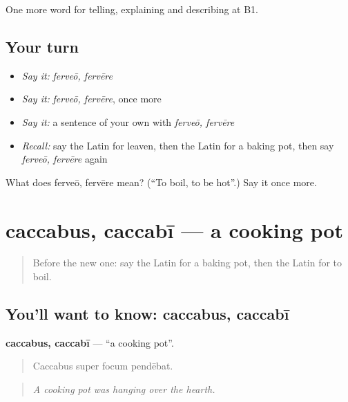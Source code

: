 \begin{grammarlens}[title={What you've built}]
One more word for telling, explaining and describing at B1.
\end{grammarlens}

\subsection*{Your turn}
\begin{itemize}
\raggedright
  \item \emph{Say it:} \emph{ferveō, fervēre}
  \item \emph{Say it:} \emph{ferveō, fervēre}, once more
  \item \emph{Say it:} a sentence of your own with \emph{ferveō, fervēre}
  \item \emph{Recall:} say the Latin for leaven, then the Latin for a baking pot, then say \emph{ferveō, fervēre} again
\end{itemize}

\begin{tcolorbox}[breakable,colback=teal!4,colframe=teal!35!black,title={Before you move on}]
What does ferveō, fervēre mean? (\textquotedblleft{}To boil, to be hot\textquotedblright{}.) Say it once more.
\end{tcolorbox}
\section[caccabus, caccabī]{caccabus, caccabī — a cooking pot}

\label{lesson:LA-C353-caccabus}



\begin{quote}
Before the new one: say the Latin for a baking pot, then the Latin for to boil.
\end{quote}

\subsection*{You'll want to know: caccabus, caccabī}
\textbf{caccabus, caccabī} — \textquotedblleft{}a cooking pot\textquotedblright{}.

\begin{quote}
Caccabus super focum pendēbat.
\end{quote}

\begin{quote}
\emph{A cooking pot was hanging over the hearth.}
\end{quote}

